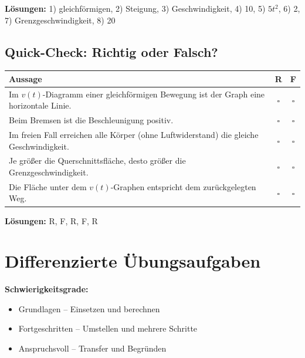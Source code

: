 \documentclass[11pt,a4paper]{article}
\begin{document}
\textbf{Lösungen:} 1) gleichförmigen, 2) Steigung, 3) Geschwindigkeit, 4) 10, 5) $5t^2$, 6) 2, 7) Grenzgeschwindigkeit, 8) 20

\subsection{Quick-Check: Richtig oder Falsch?}

\begin{center}
\begin{tabular}{|p{10cm}|c|c|}
\hline
\rowcolor{lightblue}
\textbf{Aussage} & \textbf{R} & \textbf{F} \\
\hline
Im $v(t)$-Diagramm einer gleichförmigen Bewegung ist der Graph eine horizontale Linie. & $\square$ & $\square$ \\
\hline
Beim Bremsen ist die Beschleunigung positiv. & $\square$ & $\square$ \\
\hline
Im freien Fall erreichen alle Körper (ohne Luftwiderstand) die gleiche Geschwindigkeit. & $\square$ & $\square$ \\
\hline
Je größer die Querschnittsfläche, desto größer die Grenzgeschwindigkeit. & $\square$ & $\square$ \\
\hline
Die Fläche unter dem $v(t)$-Graphen entspricht dem zurückgelegten Weg. & $\square$ & $\square$ \\
\hline
\end{tabular}
\end{center}

\textbf{Lösungen:} R, F, R, F, R

\newpage
\section{Differenzierte Übungsaufgaben}

\begin{tcolorbox}[colback=merkegreen!10, colframe=merkegreen, boxrule=1pt]
\textbf{Schwierigkeitsgrade:}
\begin{itemize}
\item[\textbf{$\star$}] Grundlagen -- Einsetzen und berechnen
\item[\textbf{$\star\star$}] Fortgeschritten -- Umstellen und mehrere Schritte
\item[\textbf{$\star\star\star$}] Anspruchsvoll -- Transfer und Begründen
\end{itemize}
\end{tcolorbox}
\end{document}
